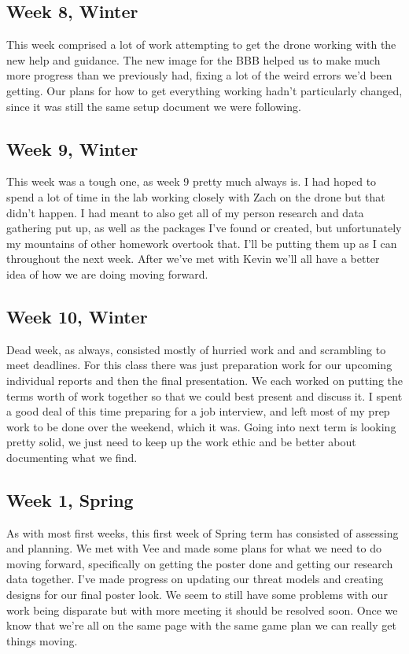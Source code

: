 \documentclass[IEEEtran,letterpaper,10pt,notitlepage,draftclsnofoot,onecolumn]{article}
\begin{document}
\subsection{Week 8, Winter}
This week comprised a lot of work attempting to get the drone working with the new help and guidance.
The new image for the BBB helped us to make much more progress than we previously had, fixing a lot of the weird errors we'd been getting.
Our plans for how to get everything working hadn't particularly changed, since it was still the same setup document we were following.

\subsection{Week 9, Winter}
This week was a tough one, as week 9 pretty much always is.
I had hoped to spend a lot of time in the lab working closely with Zach on the drone but that didn't happen.
I had meant to also get all of my person research and data gathering put up, as well as the packages I've found or created, but unfortunately my mountains of other homework overtook that. I'll be putting them up as I can throughout the next week. After we've met with Kevin we'll all have a better idea of how we are doing moving forward.

\subsection{Week 10, Winter}
Dead week, as always, consisted mostly of hurried work and and scrambling to meet deadlines. For this class there was just preparation work for our upcoming individual reports and then the final presentation. We each worked on putting the terms worth of work together so that we could best present and discuss it. I spent a good deal of this time preparing for a job interview, and left most of my prep work to be done over the weekend, which it was. Going into next term is looking pretty solid, we just need to keep up the work ethic and be better about documenting what we find.

\subsection{Week 1, Spring}
As with most first weeks, this first week of Spring term has consisted of assessing and planning. We met with Vee and made some plans for what we need to do moving forward, specifically on getting the poster done and getting our research data together. I've made progress on updating our threat models and creating designs for our final poster look. We seem to still have some problems with our work being disparate but with more meeting it should be resolved soon. Once we know that we're all on the same page with the same game plan we can really get things moving.
\end{document}
